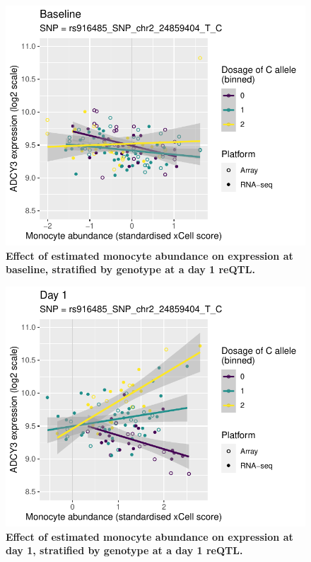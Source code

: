 \begin{figure}
    \centering
    \includegraphics[width=1.0\textwidth,page=1]{mainmatter/figures/chapter_03/lme4qtl.ENSG00000138031_Monocyte_baseline.pdf}
    \caption{
        \textbf{Effect of estimated monocyte abundance on  expression at baseline, stratified by genotype at a day 1  \gls{reQTL}.}
    }
    \label{fig:hird_reQTL_ADCY3_vs_monocyte_baseline}
\end{figure}

\begin{figure}
    \centering
    \includegraphics[width=1.0\textwidth,page=1]{mainmatter/figures/chapter_03/lme4qtl.ENSG00000138031_Monocyte_day1.pdf}
    \caption{
        \textbf{Effect of estimated monocyte abundance on  expression at day 1, stratified by genotype at a day 1  \gls{reQTL}.}
    }
    \label{fig:hird_reQTL_ADCY3_vs_monocyte_day1}
\end{figure}

